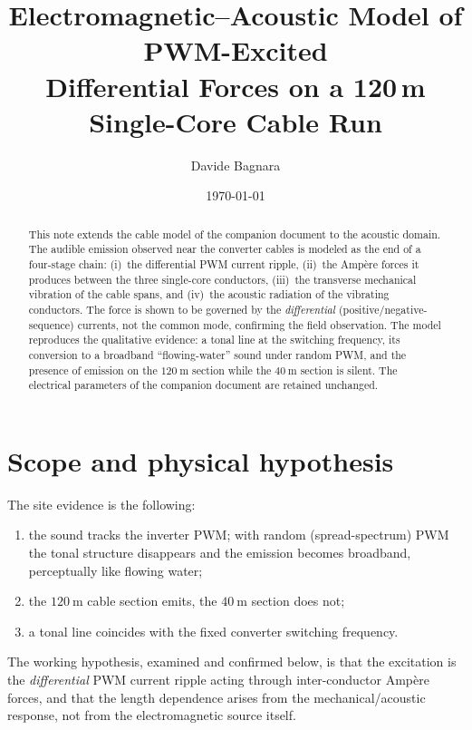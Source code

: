 \documentclass[11pt,a4paper]{article}
\title{\textbf{Electromagnetic--Acoustic Model of PWM-Excited\\
Differential Forces on a 120\,m Single-Core Cable Run}}
\author{Davide Bagnara}
\date{\today}
\begin{document}
\maketitle

\begin{abstract}
\noindent
This note extends the cable model of the companion document to the acoustic
domain. The audible emission observed near the converter cables is modeled as the
end of a four-stage chain: (i)~the differential PWM current ripple, (ii)~the
Amp\`ere forces it produces between the three single-core conductors, (iii)~the
transverse mechanical vibration of the cable spans, and (iv)~the acoustic
radiation of the vibrating conductors. The force is shown to be governed by the
\emph{differential} (positive/negative-sequence) currents, not the common mode,
confirming the field observation. The model reproduces the qualitative evidence:
a tonal line at the switching frequency, its conversion to a broadband
``flowing-water'' sound under random PWM, and the presence of emission on the
$120\ \mathrm{m}$ section while the $40\ \mathrm{m}$ section is silent. The
electrical parameters of the companion document are retained unchanged.
\end{abstract}

\tableofcontents
\bigskip

\section{Scope and physical hypothesis}
The site evidence is the following:
\begin{enumerate}[leftmargin=*,nosep]
\item the sound tracks the inverter PWM; with random (spread-spectrum) PWM the
tonal structure disappears and the emission becomes broadband, perceptually like
flowing water;
\item the $120\ \mathrm{m}$ cable section emits, the $40\ \mathrm{m}$ section does
not;
\item a tonal line coincides with the fixed converter switching frequency.
\end{enumerate}
The working hypothesis, examined and confirmed below, is that the excitation is the
\emph{differential} PWM current ripple acting through inter-conductor Amp\`ere
forces, and that the length dependence arises from the mechanical/acoustic
response, not from the electromagnetic source itself.
\end{document}
